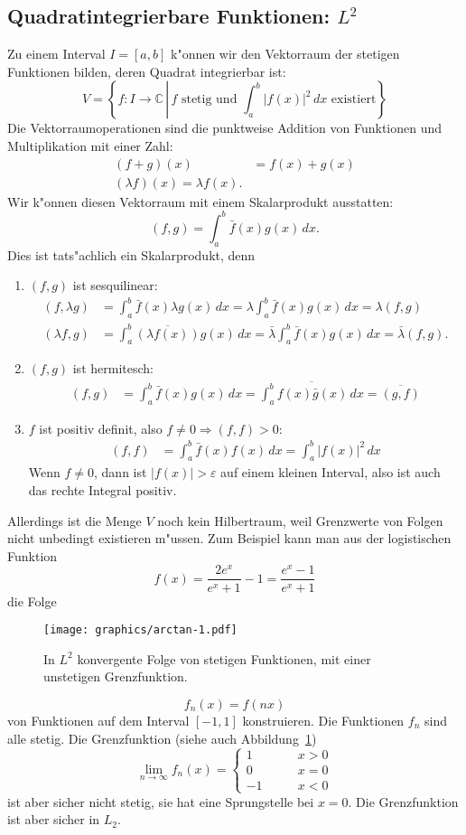 \subsection{Quadratintegrierbare Funktionen: $L^2$}
Zu einem Interval $I=[a,b]$ k"onnen wir den Vektorraum der stetigen Funktionen
bilden, deren Quadrat integrierbar ist:
\[
V=\left\{
f:I\to\mathbb C\,\left|\,
\text{$f$ stetig und $\displaystyle \int_a^b|f(x)|^2\,dx$ existiert}
\right. \right\}
\]
Die Vektorraumoperationen sind die punktweise Addition von Funktionen
und Multiplikation mit einer Zahl:
\begin{align*}
(f+g)(x)&=f(x)+g(x)\\
(\lambda f)(x)=\lambda f(x).
\end{align*}
Wir k"onnen diesen Vektorraum mit einem Skalarprodukt ausstatten:
\[
(f,g)=\int_a^b \bar f(x)g(x)\,dx.
\]
Dies ist tats"achlich ein Skalarprodukt, denn
\begin{enumerate}
\item $(f,g)$ ist sesquilinear:
\begin{align*}
(f,\lambda g)&=\int_a^b\bar f(x)\lambda g(x)\,dx
=\lambda\int_a^b\bar f(x)g(x)\,dx = \lambda(f,g)
\\
(\lambda f,g)&=\int_a^b\overline{(\lambda f(x))}g(x)\,dx
=
\bar\lambda\int_a^b\bar f(x)g(x)\,dx=\bar\lambda (f,g).
\end{align*}
\item $(f,g)$ ist hermitesch:
\begin{align*}
(f,g)&=\int_a^b\bar f(x)g(x)\,dx = \overline{
\int_a^b f(x)\bar g(x)\,dx
}
=
\overline{(g,f)}
\end{align*}
\item $f$ ist positiv definit, also $f\ne 0\Rightarrow (f,f) >0$:
\begin{align*}
(f,f)&=\int_a^b \bar f(x)f(x)\,dx=\int_a^b|f(x)|^2\,dx
\end{align*}
Wenn $f\ne 0$, dann ist $|f(x)|>\varepsilon$ auf einem kleinen Interval,
also ist auch das rechte Integral positiv.
\end{enumerate}
Allerdings ist die Menge $V$ noch kein Hilbertraum, weil Grenzwerte von
Folgen nicht unbedingt existieren m"ussen. Zum Beispiel kann man aus
der logistischen Funktion
\[
f(x)=\frac{2e^x}{e^x+1}-1=\frac{e^x-1}{e^x+1}
\]
die Folge
\begin{figure}
\centering
\texttt{[image: graphics/arctan-1.pdf]}
\caption{In $L^2$ konvergente Folge von stetigen Funktionen, mit einer
unstetigen Grenzfunktion.
\label{skript:logisticfunction}}
\end{figure}
\[
f_n(x)=f(nx)
\]
von Funktionen auf dem Interval $[-1,1]$ konstruieren. Die Funktionen
$f_n$ sind alle stetig.
Die Grenzfunktion (siehe auch Abbildung~\ref{skript:logisticfunction})
\[
\lim_{n\to \infty}f_n(x)=\begin{cases}
1&\qquad x > 0\\
0&\qquad x = 0\\
-1&\qquad x < 0
\end{cases}
\]
ist aber sicher nicht stetig, sie hat eine Sprungstelle bei $x=0$.
Die Grenzfunktion ist aber sicher in $L_2$.

